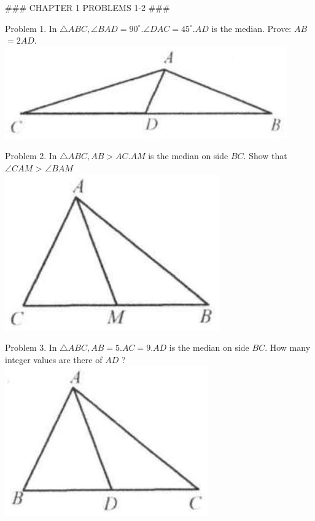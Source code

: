 \documentclass[10pt]{article}
\begin{document}
### CHAPTER 1 PROBLEMS 1-2 ###

Problem 1. In \(\triangle A B C, \angle B A D=90^{\circ} . \angle D A C=45^{\circ} . A D\) is the median. Prove: \(A B\) \(=2 A D\).\\
\includegraphics[max width=\textwidth, center]{2025_04_17_97bc1f7e44d93c271a88g-027(3)}

Problem 2. In \(\triangle A B C, A B>A C . A M\) is the median on side \(B C\). Show that \(\angle C A M\) > \(\angle B A M\)\\
\includegraphics[max width=\textwidth, center]{2025_04_17_97bc1f7e44d93c271a88g-027}

Problem 3. In \(\triangle A B C, A B=5 . A C=9 . A D\) is the median on side \(B C\). How many integer values are there of \(A D\) ?\\
\includegraphics[max width=\textwidth, center]{2025_04_17_97bc1f7e44d93c271a88g-027(2)}
\end{document}
